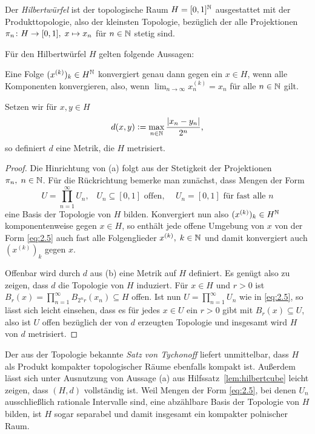 \documentclass[../main/main.tex]{subfiles}
\begin{document}
	\begin{Definition}[Hilbertwürfel]
		Der \emph{Hilbertwürfel} ist der topologische Raum $H = [0, 1]^{\mathbb{N}}$ 
		ausgestattet mit der Produkttopologie, also der kleinsten Topologie, 
		bezüglich der alle Projektionen $\pi_n \colon H \to [0, 1], \; x \mapsto x_n $ für $n \in \mathbb{N}$ stetig sind.
	\end{Definition}

	\begin{Hilfssatz}
		\label{lem:hilbertcube}
		Für den Hilbertwürfel $H$ gelten folgende Aussagen:
		\begin{enumeratethm}
			\item Eine Folge $(x^{(k)})_k \in H^{\mathbb{N}}$ konvergiert genau dann gegen 
			ein $x \in H$, wenn alle Komponenten konvergieren, also, wenn
			$\lim_{n \to \infty} x_n^{(k)} = x_n$ für alle $n \in \mathbb{N}$ gilt.
			\item Setzen wir für $x, y \in H$
			$$d(x, y) \vcentcolon = \max_{n \in \mathbb{N}} \frac{|x_n - y_n|}{2^n} \text{,}$$
			so definiert $d$ eine Metrik, die $H$ metrisiert.
		\end{enumeratethm}
	\end{Hilfssatz}

	\begin{proof}
		Die Hinrichtung von (a) folgt aus der Stetigkeit der Projektionen 
		$\pi_n, \; n \in \mathbb{N}$. Für die Rückrichtung bemerke man zunächst, dass Mengen der Form 
		\[U = \prod_{n=1}^{\infty} U_n\text{,} \quad U_n \subseteq [0, 1] \text{ offen, }
		 \quad U_n = [0, 1] \text{ für fast alle } n \label{eq:2.5} \tag{2.5}\]
		eine Basis der Topologie von $H$ bilden. 
		Konvergiert nun also $(x^{(k)})_k \in H^{\mathbb{N}}$ komponentenweise gegen $x \in H$, 
		so enthält jede offene Umgebung von $x$ von der Form \eqref{eq:2.5} auch fast 
		alle Folgenglieder $x^{(k)}, \; k \in \mathbb{N}$ und damit konvergiert 
		auch $(x^{(k)})_k$ gegen $x$.
		
		Offenbar wird durch $d$ aus (b) eine Metrik auf $H$ definiert. 
		Es genügt also zu zeigen, dass $d$ die Topologie von $H$ induziert. 
		Für $x \in H$ und $r > 0$ ist $B_r(x) = \prod_{n=1}^{\infty} B_{2^n r}(x_n) \subseteq H$ 
		offen. Ist nun $U = \prod_{n=1}^{\infty} U_n$ wie in \eqref{eq:2.5}, 
		so lässt sich leicht einsehen, dass es für jedes $x \in U$ ein $r > 0$ 
		gibt mit $B_r(x) \subseteq U$, also ist $U$ offen bezüglich der von $d$ 
		erzeugten Topologie und insgesamt wird $H$ von $d$ metrisiert.
	\end{proof}

	\begin{Bemerkung}
		Der aus der Topologie bekannte \emph{Satz von Tychonoff} liefert 
		unmittelbar, dass $H$ als Produkt kompakter topologischer Räume 
		ebenfalls kompakt ist.
		Außerdem lässt sich unter Ausnutzung von Aussage (a) aus 
		Hilfssatz~\ref{lem:hilbertcube} leicht zeigen, dass $(H, d)$ 
		vollständig ist. Weil Mengen der Form \eqref{eq:2.5}, bei denen 
		$U_n$ ausschließlich rationale Intervalle sind, eine abzählbare 
		Basis der Topologie von $H$ bilden, ist $H$ sogar separabel und 
		damit insgesamt ein kompakter polnischer Raum.
	\end{Bemerkung}
\end{document}
